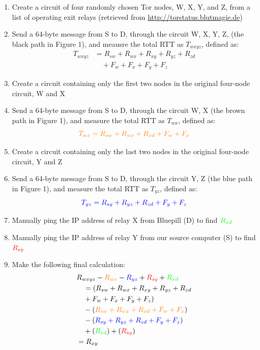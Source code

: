 \documentclass[twocolumn,11pt]{article}
\begin{document}
\begin{enumerate}
\item Create a circuit of four randomly chosen Tor nodes, W, X, Y, and Z, from a list of operating exit relays (retrieved from \href{http://torstatus.blutmagie.de}{http://torstatus.blutmagie.de})
\item Send a 64-byte message from S to D, through the circuit W, X, Y, Z, (the black path in Figure 1), and meausre the total RTT as $T_{wxyz}$, defined as:
\begin{align*}
T_{wxyz} &= R_{sw} + R_{wx} + R_{xy} + R_{yz} + R_{zd} \\
  &\quad + F_w + F_x + F_y + F_z
\end{align*}
\item Create a circuit containing only the first two nodes in the original four-node circuit, W and X
\item Send a 64-byte message from S to D, through the circuit W, X (the brown path in Figure 1), and measure the total RTT as $T_{wx}$, defined as:
\[\color{orange} 
T_{wx} = R_{sw} + R_{wx} + R_{xd} + F_w + F_x
\]
\vspace{-.7cm}
\item Create a circuit containing only the last two nodes in the original four-node circuit, Y and Z
\item Send a 64-byte message from S to D, through the circuit Y, Z (the blue path in Figure 1), and measure the total RTT as $T_{yz}$, defined as:
\[\color{blue}
T_{yz} = R_{sy} + R_{yz} + R_{zd} + F_y + F_z
\] 
\vspace{-.7cm}
\item Manually ping the IP address of relay X from Bluepill (D) to find $\color{green} R_{xd}$
\item Manually ping the IP address of relay Y from our source computer (S) to find $\color{red} R_{sy}$
\item Make the following final calculation:
\begin{align*}
& R_{wxyz} - \color{orange}R_{wx} \color{black}- \color{blue}R_{yz} \color{black}+ \color{red}R_{sy} \color{black}+ \color{green}R_{xd} \\
&\quad = (\color{black} R_{sw} + R_{wx} + R_{xy} + R_{yz} + R_{zd} \\&\quad + F_w + F_x + F_y + F_z) \\
&\quad - (\color{orange} R_{sw} + R_{wx} + R_{xd} + F_w + F_x\color{black}) \\
&\quad - (\color{blue} R_{sy} + R_{yz} + R_{zd} + F_y + F_z\color{black})\\
&\quad + (\color{green} R_{xd}\color{black}) + (\color{red} R_{sy}\color{black}) \\
& = R_{xy}
\end{align*}
\end{enumerate}
\end{document}
